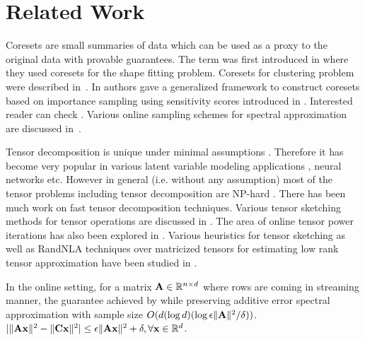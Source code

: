 \section{Related Work}{\label{sec:related}}
Coresets are small summaries of data which 
can be used as a proxy to the original data with provable guarantees. The term was first introduced in \cite{agarwal2004approximating} where they used coresets for the shape fitting problem. Coresets for clustering problem were described in~\cite{har2004coresets}. 
In \cite{feldman2011unified} authors gave a generalized framework to construct coresets based on importance sampling using sensitivity scores introduced in \cite{langberg2010universal}. Interested reader can check \cite{woodruff2014sketching, braverman2016new, bachem2017practical}. Various online sampling schemes for spectral approximation are discussed in~\cite{cohen2016online, cohen2017input}. 

Tensor decomposition is unique under minimal assumptions \cite{kruskal1977three}. Therefore it has become very popular in various latent variable modeling applications \cite{anandkumar2012method, hsu2012spectral, anandkumar2014tensor}, neural networks \cite{janzamin2015beating} etc. However in general (i.e. without any assumption) most of the tensor problems including tensor decomposition are NP-hard \cite{hillar2013most}. There has been much work on fast tensor decomposition techniques. Various tensor sketching methods for tensor operations are discussed in \cite{bhojanapalli2015new, wang2015fast, song2016sublinear}. 
The area of online tensor power iterations has also been explored in \cite{huang2015online, wang2016online}. 
Various heuristics for tensor sketching as well as RandNLA techniques \cite{woodruff2014sketching} over matricized tensors for estimating low rank tensor approximation have been studied in \cite{song2019relative}.

In the online setting, for a matrix $\mathbf{A} \in \mathbb{R}^{n \times d}$ where rows are coming in streaming manner, the guarantee achieved by \cite{cohen2016online} while preserving additive error spectral approximation with sample size $O(d(\log d)(\log \epsilon\|\mathbf{A}\|^{2}/\delta))$. $|\|\mathbf{A}\mathbf{x}\|^{2} - \|\mathbf{C}\mathbf{x}\|^{2}| \leq \epsilon \|\mathbf{A}\mathbf{x}\|^{2} + \delta, \forall \mathbf{x} \in \mathbb{R}^{d}$.

